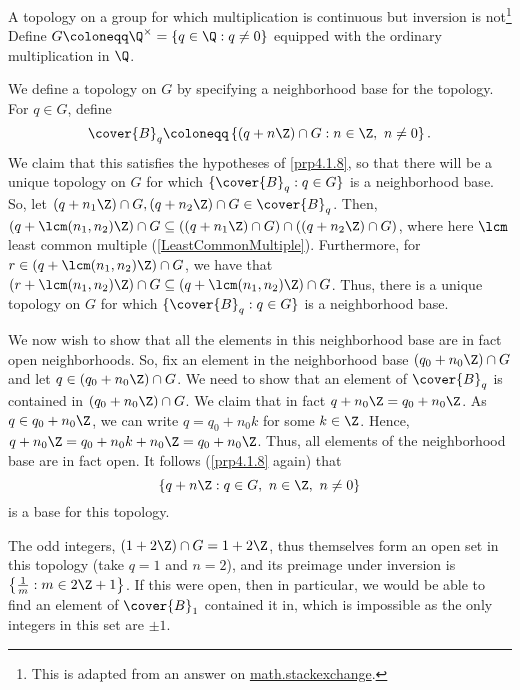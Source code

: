 \begin{exm}{A topology on a group for which multiplication is continuous but inversion is not}{}\footnote{This is adapted from an answer on \href{http://math.stackexchange.com/questions/1393303/group-of-units-in-a-topological-ring}{math.stackexchange}.}
Define $G\coloneqq \Q ^{\times}=\left\{ q\in \Q :q\neq 0\right\}$ equipped with the ordinary multiplication in $\Q$.

We define a topology on $G$ by specifying a neighborhood base for the topology.  For $q\in G$, define
\begin{equation}
\cover{B}_q\coloneqq \left\{ (q+n\Z )\cap G:n\in \Z ,\ n\neq 0\right\} .
\end{equation}
We claim that this satisfies the hypotheses of \cref{prp4.1.8}, so that there will be a unique topology on $G$ for which $\{ \cover{B}_q:q\in G\}$ is a neighborhood base.  So, let $(q+n_1\Z )\cap G,(q+n_2\Z )\cap G\in \cover{B}_q$.  Then, $(q+\lcm (n_1,n_2)\Z )\cap G\subseteq( (q+n_1\Z )\cap G)\cap ((q+n_2\Z )\cap G)$, where here $\lcm$ least common multiple (\cref{LeastCommonMultiple}).  Furthermore, for $r\in (q+\lcm (n_1,n_2)\Z )\cap G$, we have that $(r+\lcm (n_1,n_2)\Z )\cap G\subseteq (q+\lcm (n_1,n_2)\Z )\cap G$.  Thus, there is a unique topology on $G$ for which $\{ \cover{B}_q:q\in G\}$ is a neighborhood base.

We now wish to show that all the elements in this neighborhood base are in fact open neighborhoods.  So, fix an element in the neighborhood base $(q_0+n_0\Z )\cap G$ and let $q\in (q_0+n_0\Z )\cap G$.  We need to show that an element of $\cover{B}_q$ is contained in $(q_0+n_0\Z )\cap G$.  We claim that in fact $q+n_0\Z =q_0+n_0\Z$.  As $q\in q_0+n_0\Z$, we can write $q=q_0+n_0k$ for some $k\in \Z$.  Hence, $q+n_0\Z =q_0+n_0k+n_0\Z =q_0+n_0\Z$.  Thus, all elements of the neighborhood base are in fact open.  It follows (\cref{prp4.1.8} again) that
\begin{equation}
\left\{ q+n\Z :q\in G,\ n\in \Z ,\ n\neq 0\right\}
\end{equation}
is a base for this topology.

The odd integers, $(1+2\Z)\cap G=1+2\Z$, thus themselves form an open set in this topology (take $q=1$ and $n=2$), and its preimage under inversion is $\left\{ \frac{1}{m}:m\in 2\Z +1\right\}$.  If this were open, then in particular, we would be able to find an element of $\cover{B}_1$ contained it in, which is impossible as the only integers in this set are $\pm 1$.


\end{exm}
